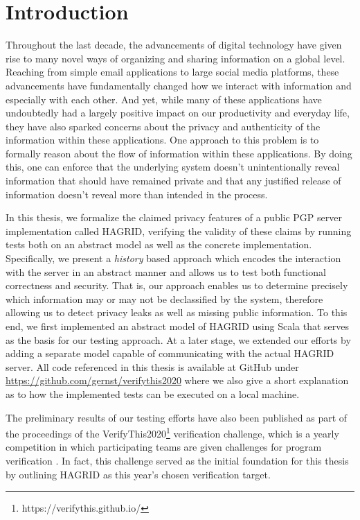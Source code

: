 \section{Introduction}
Throughout the last decade, the advancements of digital technology have given rise to many novel ways of organizing and sharing information on a global level.
Reaching from simple email applications to large social media platforms, these advancements have fundamentally changed how we interact with information and especially with each other.
And yet, while many of these applications have undoubtedly had a largely positive impact on our productivity and everyday life, they have also sparked concerns about the privacy and authenticity of the information within these applications. 
One approach to this problem is to formally reason about the flow of information within these applications. By doing this, one can enforce that the underlying system doesn't unintentionally reveal information that should have remained private and that any justified release of information doesn't reveal more than intended in the process.

In this thesis, we formalize the claimed privacy features of a public PGP server implementation called HAGRID, verifying the validity of these claims by running tests both on an abstract model as well as the concrete implementation. Specifically, we present a \emph{history} based approach which encodes the interaction with the server in an abstract manner and allows us to test both functional correctness and security. That is, our approach enables us to determine precisely which information may or may not be declassified by the system, therefore allowing us to detect privacy leaks as well as missing public information. To this end, we first implemented an abstract model of HAGRID using Scala that serves as the basis for our testing approach. At a later stage, we extended our efforts by adding a separate model capable of communicating with the actual HAGRID server. All code referenced in this thesis is available at GitHub under \url{https://github.com/gernst/verifythis2020} where we also give a short explanation as to how the implemented tests can be executed on a local machine.

The preliminary results of our testing efforts have also been published as part of the proceedings of the VerifyThis2020\footnote{https://verifythis.github.io/} verification challenge, which is a yearly competition in which participating teams are given challenges for program verification \cite{VTLTC2020/IFTesting}. In fact, this challenge served as the initial foundation for this thesis by outlining HAGRID as this year's chosen verification target.

